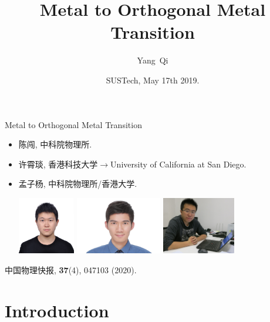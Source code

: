 \documentclass[xcolor=table, 10pt, aspectratio=169]{beamer}
\title[EQMC] %
{Metal to Orthogonal Metal Transition}
\author[Y Qi] %
{Yang~Qi}
\institute[Fudan] %
{
Department of Physics, Fudan University.
}
\date{SUSTech, May 17th 2019.}
\begin{document}

\begin{frame}{Metal to Orthogonal Metal Transition}
\begin{itemize}
\item 陈闯, 中科院物理所.
\item 许霄琰, 香港科技大学$\rightarrow$University of California at San Diego.
\item 孟子杨, 中科院物理所/香港大学.
\begin{center}
  \includegraphics[height=2.5cm]{../people/chuangchen}
  \includegraphics[height=2.5cm]{../people/xiaoyanxu}
  \includegraphics[height=2.5cm]{../people/ziyangmeng}
\end{center}
\end{itemize}
\begin{center}
  中国物理快报, \textbf{37}(4), 047103 (2020).
\end{center}
\end{frame}

\section{Introduction}
\end{document}
